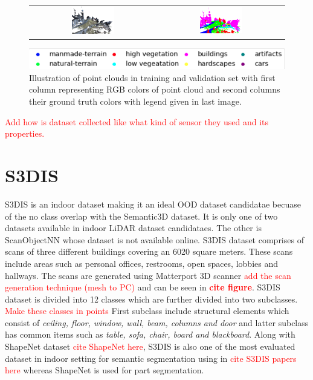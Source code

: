\begin{figure}
\begin{tabular}{cc}
        \includegraphics[width=0.35\textwidth, height=0.15\textheight]{images/sem3d_data/5.pdf} & 
        \includegraphics[width=0.35\textwidth, height=0.15\textheight]{images/sem3d_data/5_gt.pdf}\\
    \end{tabular}
    \includegraphics[scale=0.65]{images/legend.png}
    \caption{Illustration of point clouds in training and validation set with first column representing RGB colors of point cloud and second columns their ground truth colors with legend given in last image.}
    \label{fig:sem3d_gt_vis}
\end{figure}

\textcolor{red}{Add how is dataset collected like what kind of sensor they used and its properties.}
\section{S3DIS}
S3DIS is an indoor dataset making it an ideal OOD dataset candidatae becuase of the no class overlap with the Semantic3D dataset.
It is only one of two datasets available in indoor LiDAR dataset candidataes. 
The other is ScanObjectNN whose dataset is not available online.
S3DIS dataset comprises of scans of three different buildings covering an 6020 square meters.
These scans include areas such as personal offices, restrooms, open spaces, lobbies and hallways.
The scans are generated using Matterport 3D scanner \textcolor{red}{add the scan generation technique (mesh to PC)} and can be seen in \textcolor{red}{\textbf{cite figure}}.
S3DIS dataset is divided into 12 classes which are further divided into two subclasses.
\textcolor{red}{Make these classes in points}
First subclass include structural elements which consist of \textit{ceiling, floor, window, wall, beam, columns and door}
and latter subclass has common items such as \textit{table, sofa, chair, board and blackboard}.
Along with ShapeNet dataset \textcolor{red}{cite ShapeNet here}, S3DIS is also one of the most evaluated dataset in indoor setting for semantic segmentation  using in \textcolor{red}{cite S3DIS papers here} whereas ShapeNet is used for part segmentation.


